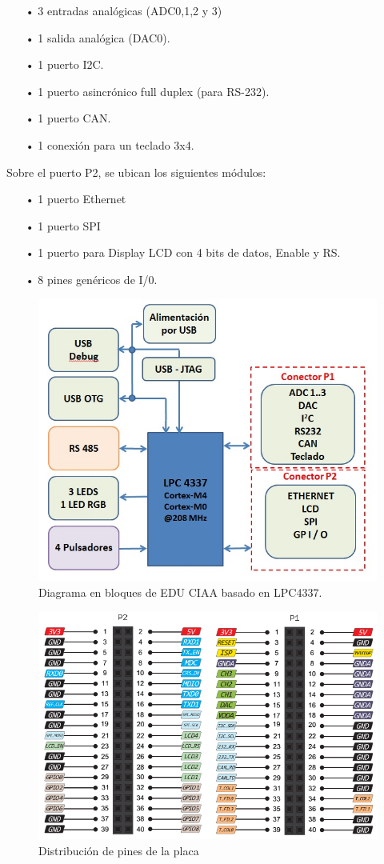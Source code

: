 \documentclass[12pt,letterpaper]{article}
\begin{document}
\begin{enumerate}
\item[•] 3 entradas analógicas (ADC0,1,2 y 3)
\item[•] 1 salida analógica (DAC0).
\item[•] 1 puerto I2C.
\item[•] 1 puerto asincrónico full duplex (para RS-232).
\item[•] 1 puerto CAN.
\item[•] 1 conexión para un teclado 3x4.
\end{enumerate}

Sobre el puerto P2, se ubican los siguientes módulos:

\begin{enumerate}
\item[•] 1 puerto Ethernet
\item[•] 1 puerto SPI
\item[•] 1 puerto para Display LCD con 4 bits de datos, Enable y RS.
\item[•] 8 pines genéricos de I/0.
\end{enumerate}


\begin{figure}[!h]
\centering
\includegraphics[width=8 cm]{figuras/diagramaenbloques.jpg}
\caption{Diagrama en bloques de EDU CIAA basado en LPC4337.}
\label{diagramaenbloques}
\end{figure}


\begin{figure}[H]
\centering
\includegraphics[width=8 cm]{figuras/f16.png}
\caption{Distribución de pines de la placa}
\label{distribucionpines}
\end{figure}
\end{document}
